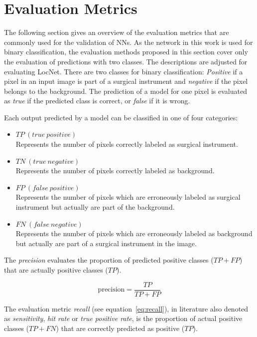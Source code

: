 \section{Evaluation Metrics}
\label{sec:evaluation_metrics}
The following section gives an overview of the evaluation metrics that are commonly used for the validation of NNs. As the network in this work is used for binary classification, the evaluation methods proposed in this section cover only the evaluation of predictions with two classes. The descriptions are adjusted for evaluating LocNet.
There are two classes for binary classification: \emph{Positive} if a pixel in an input image is part of a surgical instrument and \emph{negative} if the pixel belongs to the background. The prediction of a model for one pixel is evaluated as \emph{true} if the predicted class is correct, or \emph{false} if it is wrong. 

Each output predicted by a model can be classified in one of four categories: 

\begin{itemize}
\item $TP\:(true\:positive)$ \\
Represents the number of pixels correctly labeled as surgical instrument.
\item $TN\:(true\:negative)$ \\
Represents the number of pixels correctly labeled as background.
\item $FP\:(false\:positive)$ \\
Represents the number of pixels which are erroneously labeled as surgical instrument but actually are part of the background.
\item $FN\:(false\:negative)$ \\
Represents the number of pixels which are erroneously labeled as background but actually are part of a surgical instrument in the image.
\end{itemize}

The \emph{precision} evaluates the proportion of predicted positive classes ($TP+FP$) that are actually positive classes ($TP$).

\begin{equation}
\label{eq:precision}
\text{precision}=\frac{TP}{TP+FP} 
\end{equation}

The evaluation metric \emph{recall} (see equation~\ref{eq:recall}), in literature also denoted as \emph{sensitivity}, \emph{hit rate} or \emph{true positive rate}, is the proportion of actual positive classes ($TP+FN$) that are correctly predicted as positive ($TP$).~\cite{powers2011eva_recall_precision}

